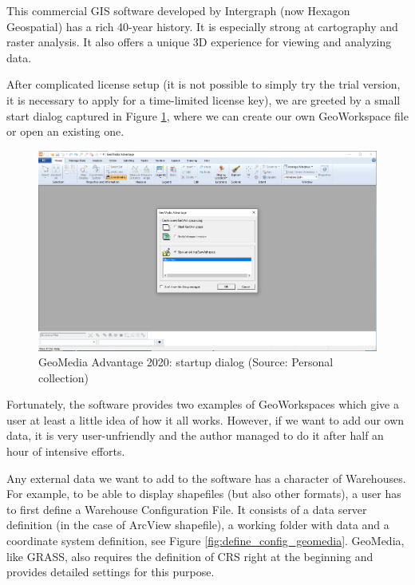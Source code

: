 \documentclass[a4paper,10pt,twoside]{article}
\begin{document}
\noindent This commercial GIS software developed by Intergraph (now Hexagon Geospatial) has a rich 40-year history. It is especially strong at cartography and raster analysis.  It also offers a unique 3D experience for viewing and analyzing data.

After complicated license setup (it is not possible to simply try the trial version, it is necessary to apply for a time-limited license key), we are greeted by a small start dialog captured in Figure \ref{fig:geomedia_startup}, where we can create our own GeoWorkspace file or open an existing one.

\vspace{0.3cm}
\begin{figure}[hbt!] 
\begin{center}
\includegraphics[width=17cm]{../pictures/geomedia_startup.png} 
\caption[GeoMedia Advantage 2020: startup dialog]{GeoMedia Advantage 2020: startup dialog (Source: Personal collection)}
\label{fig:geomedia_startup}
\end{center}
\end{figure}

\noindent Fortunately, the software provides two examples of GeoWorkspaces which give a user at least a little idea of how it all works. However, if we want to add our own data, it is very user-unfriendly and the author managed to do it after half an hour of intensive efforts.

Any external data we want to add to the software has a character of Warehouses. For example, to be able to display shapefiles (but also other formats), a user has to first define a Warehouse Configuration File. It consists of a data server definition (in the case of ArcView shapefile), a working folder with data and a coordinate system definition, see Figure \ref{fig:define_config_geomedia}. GeoMedia, like GRASS, also requires the definition of CRS right at the beginning and provides detailed settings for this purpose.
\end{document}
